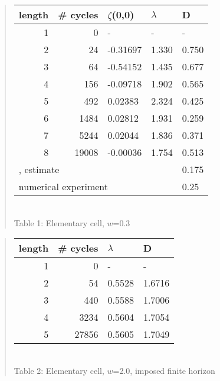 \documentclass[pre,preprint,groupedaddress,showpacs,showkeys]{revtex4}
\begin{document}
\begin{quote} \begin{center}
\begin{tabular}{|r|r|l|l|l|}
\hline
length & \# cycles & $\zeta$(0,0) & $\lambda$ & D \\ \hline\hline
1      & 0      &   -    &   -  &   - \\
2      & 24     & -0.31697 & 1.330 & 0.750\\
3      & 64     & -0.54152 & 1.435 & 0.677\\
4      & 156    & -0.09718 & 1.902 & 0.565\\
5      & 492    &  0.02383 & 2.324 & 0.425\\
6      & 1484   &  0.02812 & 1.931 & 0.259\\
7      & 5244   &  0.02044 & 1.836 & 0.371\\
8      & 19008  & -0.00036 & 1.754 & 0.513\\ \hline\hline
\multicolumn{4}{|l|}{{MacZwa83}, estimate} & 0.175 \\
\multicolumn{4}{|l|}{numerical experiment} & 0.25 \\ \hline
\end{tabular}\\[10pt]
{Table 1: Elementary cell, $w$=0.3}
\end{center}\end{quote}

\begin{quote} \begin{center}
\begin{tabular}{|r|r|l|l|}
\hline
length & \# cycles & $\lambda$ & D \\ \hline\hline
1      & 0      &   -    &    - \\
2 &     54      & 0.5528 &  1.6716\\
3 &    440      & 0.5588 &  1.7006\\
4 &   3234      & 0.5604 &  1.7054\\
5 &  27856      & 0.5605 &  1.7049\\ \hline
\end{tabular}\\[10pt]
{Table 2: Elementary cell, $w$=2.0, imposed finite horizon}
\end{center}\end{quote}
\end{document}
